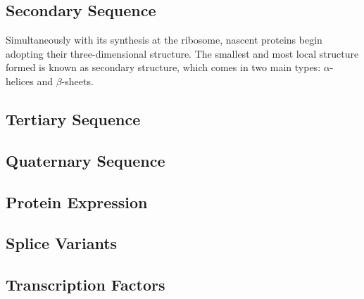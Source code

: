 \subsection{Secondary Sequence}

Simultaneously with its synthesis at the ribosome, nascent proteins begin adopting their three-dimensional structure. The smallest and most local structure formed is known as secondary structure, which comes in two main types: \(\alpha\)-helices and \(\beta\)-sheets. 

\subsection{Tertiary Sequence}
\subsection{Quaternary Sequence}
\subsection{Protein Expression}
\subsection{Splice Variants}
\subsection{Transcription Factors}